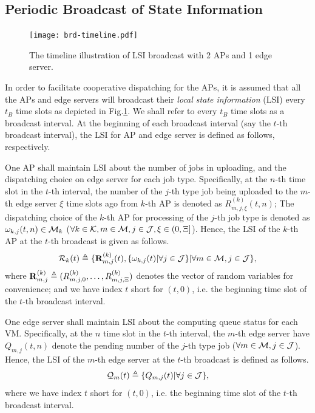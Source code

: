 \subsection{Periodic Broadcast of State Information}

\begin{figure}[ht]
    \centering
    \texttt{[image: brd-timeline.pdf]}
    \caption{The timeline illustration of LSI broadcast with 2 APs and 1 edge server.}
    \label{fig:brd-timeline}
\end{figure}

In order to facilitate cooperative dispatching for the APs, it is assumed that all the APs and edge servers will broadcast their \emph{local state information} (LSI) every $t_B$ time slots as depicted in Fig.\ref{fig:brd-timeline}.
We shall refer to every $t_B$ time slots as a broadcast interval.
At the beginning of each broadcast interval (say the $t$-th broadcast interval), the LSI for AP and edge server is defined as follows, respectively.

\begin{definition}
    One AP shall maintain LSI about the number of jobs in uploading, and the dispatching choice on edge server for each job type.
    Specifically, at the $n$-th time slot in the $t$-th interval, the number of the $j$-th type job being uploaded to the $m$-th edge server $\xi$ time slots ago from $k$-th AP is denoted as $R^{(k)}_{m,j,\xi}({t,n})$;
    The dispatching choice of the $k$-th AP for processing of the $j$-th job type is denoted as $\omega_{k,j}(t,n) \in \mathcal{M}_{k}$ ($\forall k\in\mathcal{K}, m\in\mathcal{M}, j\in\mathcal{J}, \xi\in(0,\Xi]$).
    Hence, the LSI of the $k$-th AP at the $t$-th broadcast is given as follows.
    \begin{align}
        \mathcal{R}_{k}(t) \triangleq \{\mathbf{R}^{(k)}_{m,j}(t), \{\omega_{k,j}(t)|\forall j\in\mathcal{J}\} | \forall m\in\mathcal{M}, j\in\mathcal{J}\},
    \end{align}
    where $\mathbf{R}^{(k)}_{m,j} \triangleq ( R^{(k)}_{m,j,0},\dots,R^{(k)}_{m,j,\Xi} )$ denotes the vector of random variables for convenience; and we have index $t$ short for $(t, 0)$, i.e. the beginning time slot of the $t$-th broadcast interval.
\end{definition}

\begin{definition}
    One edge server shall maintain LSI about the computing queue status for each VM.
    Specifically, at the $n$ time slot in the $t$-th interval, the $m$-th edge server have $Q_{m,j}({t,n})$ denote the pending number of the $j$-th type job ($\forall m\in\mathcal{M}, j\in\mathcal{J}$).
    Hence, the LSI of the $m$-th edge server at the $t$-th broadcast is defined as follows.
    \begin{align}
        \mathcal{Q}_{m}(t) \triangleq \{Q_{m,j}(t) | \forall j\in\mathcal{J}\},
    \end{align}
    where we have index $t$ short for $(t, 0)$, i.e. the beginning time slot of the $t$-th broadcast interval.
\end{definition}

